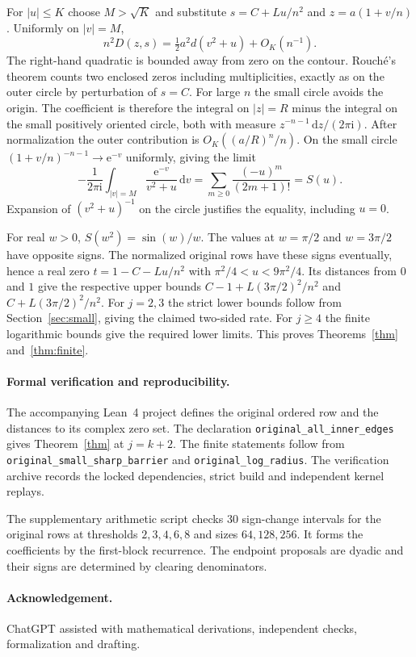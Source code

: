 \documentclass[11pt]{article}
\newcommand{\ee}{\mathrm e}
\newcommand{\ii}{\mathrm i}
\newcommand{\dd}{\,\mathrm d}
\begin{document}
For $|u|\le K$ choose $M>\sqrt K$ and substitute $s=C+Lu/n^2$ and $z=a(1+v/n)$. Uniformly on $|v|=M$,
\[
 n^2D(z,s)=\tfrac12a^2d(v^2+u)+O_K(n^{-1}).
\]
The right-hand quadratic is bounded away from zero on the contour. Rouch\'e's theorem counts two enclosed zeros including multiplicities, exactly as on the outer circle by perturbation of $s=C$. For large $n$ the small circle avoids the origin. The coefficient is therefore the integral on $|z|=R$ minus the integral on the small positively oriented circle, both with measure $z^{-n-1}\dd z/(2\pi\ii)$. After normalization the outer contribution is $O_K((a/R)^n/n)$. On the small circle $(1+v/n)^{-n-1}\to\ee^{-v}$ uniformly, giving the limit
\[
 -\frac1{2\pi\ii}\int_{|v|=M}\frac{\ee^{-v}}{v^2+u}\dd v
 =\sum_{m\ge0}\frac{(-u)^m}{(2m+1)!}=S(u).
\]
Expansion of $(v^2+u)^{-1}$ on the circle justifies the equality, including $u=0$.

For real $w>0$, $S(w^2)=\sin(w)/w$. The values at $w=\pi/2$ and $w=3\pi/2$ have opposite signs. The normalized original rows have these signs eventually, hence a real zero $t=1-C-Lu/n^2$ with $\pi^2/4<u<9\pi^2/4$. Its distances from $0$ and $1$ give the respective upper bounds $C-1+L(3\pi/2)^2/n^2$ and $C+L(3\pi/2)^2/n^2$. For $j=2,3$ the strict lower bounds follow from Section~\ref{sec:small}, giving the claimed two-sided rate. For $j\ge4$ the finite logarithmic bounds give the required lower limits. This proves Theorems~\ref{thm} and~\ref{thm:finite}.

\paragraph{Formal verification and reproducibility.}
The accompanying Lean~4 project defines the original ordered row and the distances to its complex zero set. The declaration \texttt{original\_all\_inner\_edges} gives Theorem~\ref{thm} at $j=k+2$. The finite statements follow from \texttt{original\_small\_sharp\_barrier} and \texttt{original\_log\_radius}. The verification archive records the locked dependencies, strict build and independent kernel replays.

The supplementary arithmetic script checks 30 sign-change intervals for the original rows at thresholds $2,3,4,6,8$ and sizes $64,128,256$. It forms the coefficients by the first-block recurrence. The endpoint proposals are dyadic and their signs are determined by clearing denominators.

\paragraph{Acknowledgement.}
ChatGPT assisted with mathematical derivations, independent checks, formalization and drafting.
\end{document}
